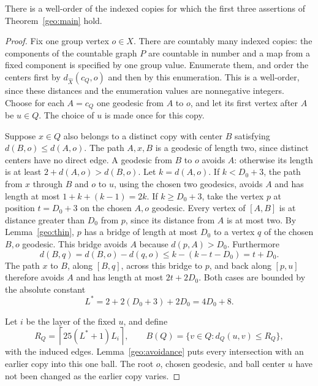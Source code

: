 \begin{proposition}
\label{geo:balls}
There is a well-order of the indexed copies for which the first three
assertions of Theorem~\ref{geo:main} hold.
\end{proposition}

\begin{proof}
Fix one group vertex $o\in X$.  There are countably many indexed copies:
the components of the countable graph $P$ are countable in number and a
map from a fixed component is specified by one group value.  Enumerate
them, and order the centers first by $d_{\widehat X}(c_Q,o)$ and then by
this enumeration.  This is a well-order, since these distances and the
enumeration values are nonnegative integers.  Choose for each $A=c_Q$ one
geodesic from $A$ to $o$, and let its first vertex after $A$ be $u\in Q$.
The choice of $u$ is made once for this copy.

Suppose $x\in Q$ also belongs to a distinct copy with center $B$ satisfying
$d(B,o)\le d(A,o)$.  The path $A,x,B$ is a geodesic of length two,
since distinct centers have no direct edge.  A geodesic from $B$ to $o$
avoids $A$: otherwise its length is at least $2+d(A,o)>d(B,o)$.
Let $k=d(A,o)$.  If $k<D_0+3$, the path from $x$ through $B$ and $o$
to $u$, using the chosen two geodesics, avoids $A$ and has length at most
$1+k+(k-1)=2k$.  If $k\ge D_0+3$, take the vertex $p$ at position
$t=D_0+3$ on the chosen $A,o$ geodesic.  Every vertex of $[A,B]$ is at
distance greater than $D_0$ from $p$, since its distance from $A$ is at
most two.  By Lemma~\ref{geo:thin}, $p$ has a bridge of length at most
$D_0$ to a vertex $q$ of the chosen $B,o$ geodesic.  This bridge avoids
$A$ because $d(p,A)>D_0$.  Furthermore
\[
 d(B,q)=d(B,o)-d(q,o)\le k-(k-t-D_0)=t+D_0.
\]
The path $x$ to $B$, along $[B,q]$, across this bridge to $p$, and back
along $[p,u]$ therefore avoids $A$ and has length at most $2t+2D_0$.
Both cases are bounded by the absolute constant
\begin{equation}
 L^*=2+2(D_0+3)+2D_0=4D_0+8.
 \label{geo:root-path-length}
\end{equation}

Let $i$ be the layer of the fixed $u$, and define
\[
 R_Q=\left\lceil25(L^*+1)L_i\right\rceil,
 \qquad B(Q)=\{v\in Q:d_Q(u,v)\le R_Q\},
\]
with the induced edges.  Lemma~\ref{geo:avoidance} puts every intersection
with an earlier copy into this one ball.  The root $o$, chosen geodesic,
and ball center $u$ have not been changed as the earlier copy varies.


\end{proof}
